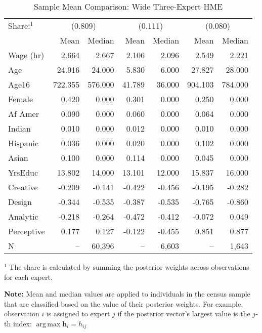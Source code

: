 \documentclass[12pt]{article}
\DeclareMathOperator*{\argmax}{arg\,max}
\begin{document}
\begin{table} \centering
  \caption{Sample Mean Comparison: Wide Three-Expert HME}
  \begin{threeparttable}
    \begin{tabular}[l]{l r r r r r r}
  \cmidrule{1-7}
  Share:$^{1}$& \multicolumn{2}{c}{(0.809)} & \multicolumn{2}{c}{(0.111)} & \multicolumn{2}{c}{(0.080)} \\
              & Mean & Median & Mean & Median & Mean & Median \\
  \cmidrule{1-7}
  Wage (hr)   &   2.664 &   2.667 &  2.106 &  2.096 &   2.549 &   2.221 \\
  Age         &  24.916 &  24.000 &  5.830 &  6.000 &  27.827 &  28.000 \\
  Age16       & 722.355 & 576.000 & 41.789 & 36.000 & 904.103 & 784.000 \\
  Female      &   0.420 &   0.000 &  0.301 &  0.000 &   0.250 &   0.000 \\
  Af Amer     &   0.090 &   0.000 &  0.060 &  0.000 &   0.064 &   0.000 \\
  Indian      &   0.010 &   0.000 &  0.012 &  0.000 &   0.010 &   0.000 \\
  Hispanic    &   0.036 &   0.000 &  0.020 &  0.000 &   0.102 &   0.000 \\
  Asian       &   0.100 &   0.000 &  0.114 &  0.000 &   0.045 &   0.000 \\
  YrsEduc     &  13.802 &  14.000 & 13.101 & 12.000 &  15.837 &  16.000 \\
  Creative    &  -0.209 &  -0.141 & -0.422 & -0.456 &  -0.195 &  -0.282 \\
  Design      &  -0.344 &  -0.535 & -0.387 & -0.535 &  -0.765 &  -0.860 \\
  Analytic    &  -0.218 &  -0.264 & -0.472 & -0.412 &  -0.072 &   0.049 \\
  Perceptive  &   0.177 &   0.127 & -0.122 & -0.455 &   0.851 &   0.877 \\
  \cmidrule{1-7}
  N           &      -- &  60,396 &     -- &  6,603 &      -- &   1,643 \\
  \hline
    \end{tabular}
    \begin{tablenotes}
      \item{\footnotesize $^{1}$ The share is calculated by summing the 
      posterior weights across observations for each expert.}
      \item{\footnotesize \textbf{Note:} Mean and median values are applied to individuals
      in the census sample that are classified based on the value of their posterior weights.
      For example, observation $i$ is assigned to expert $j$ if the posterior vector's
      largest value is the $j$-th index: $\argmax \boldsymbol{h}_{i} = h_{ij}$}
    \end{tablenotes} \label{tbl:ME3_sample_comparison}
  \end{threeparttable}
\end{table}
\end{document}
